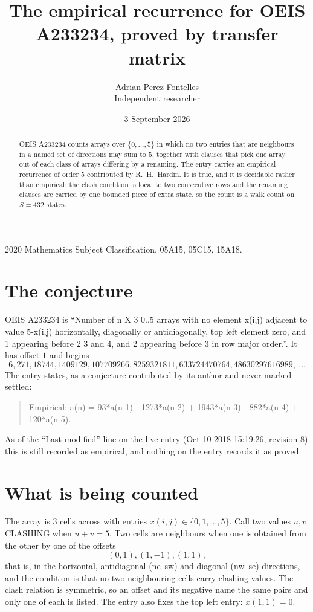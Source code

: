 \documentclass[11pt,a4paper]{article}
\title{The empirical recurrence for OEIS A233234, proved by transfer matrix}
\author{Adrian Perez Fontelles\\ \small Independent researcher}
\date{3 September 2026}
\theoremstyle{plain}
\theoremstyle{definition}
\begin{document}
\maketitle

\begin{abstract}
OEIS A233234 counts arrays over $\{0,\dots,5\}$ in which no two entries that are neighbours in
a named set of directions may sum to $5$, together with clauses that pick one array out of
each class of arrays differing by a renaming. The entry carries an empirical recurrence of
order $5$ contributed by R.~H.~Hardin. It is true, and it is decidable rather than
empirical: the clash condition is local to two consecutive rows and the renaming clauses are
carried by one bounded piece of extra state, so the count is a walk count on $S=432$ states.
\end{abstract}

\noindent\small 2020 Mathematics Subject Classification. 05A15, 05C15, 15A18.\normalsize

\section{The conjecture}

OEIS A233234 is ``Number of n X 3 0..5 arrays with no element x(i,j) adjacent to value 5-x(i,j) horizontally, diagonally or antidiagonally, top left element zero, and 1 appearing before 2 3 and 4, and 2 appearing before 3 in row major order.''. It has offset $1$ and begins
\[
6, 271, 18744, 1409129, 107709266, 8259321811, 633724470764, 48630297616989,\ \dots
\]
The entry states, as a conjecture contributed by its author and never marked settled:
\begin{quote}
Empirical: a(n) = 93*a(n-1) - 1273*a(n-2) + 1943*a(n-3) - 882*a(n-4) + 120*a(n-5).
\end{quote}
As of the ``Last modified'' line on the live entry (Oct 10 2018 15:19:26, revision 8) this is still
recorded as empirical, and nothing on the entry records it as proved.

\section{What is being counted}

The array is $3$ cells across with entries $x(i,j)\in\{0,1,\dots,5\}$. Call two values $u,v$ CLASHING
when $u+v=5$. Two cells are neighbours when one is obtained from the other by one of
the offsets
\[
(0,1), (1,-1), (1,1),
\]
that is, in the horizontal, antidiagonal (ne--sw) and diagonal (nw--se) directions, and the condition is that no two neighbouring cells carry
clashing values. The clash relation is symmetric, so an offset and its negative name the
same pairs and only one of each is listed. The entry also fixes the top left entry: $x(1,1)=0$.
\end{document}
